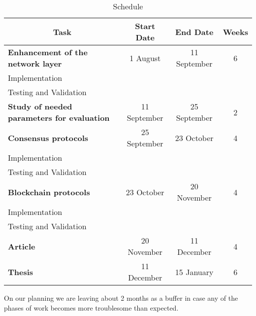 \begin{table}[ht]
\centering
\caption{Schedule}
\label{tab:schedule}
\begin{tabular}{lccc}
  \toprule
  \multicolumn{1}{c}{\textbf{Task}}					& \textbf{Start Date} & \textbf{End Date} & \textbf{Weeks}	\\ 
  \midrule
  \textbf{Enhancement of the network layer}					& 1 August            & 11 September          & 6             	\\
  \quad Implementation 								&                     &                   &                	\\ 
  \quad Testing and Validation 								&                     &                   &                	\\
  \midrule
  \textbf{Study of needed parameters for evaluation}						& 11 September            & 25 September       & 2         	\\
  \midrule
  \textbf{Consensus protocols}						& 25 September             & 23 October       & 4              	\\
  \quad Implementation 								&                     &                   &                	\\ 
  \quad Testing and Validation								&                     &                   &                	\\ 
  \midrule
  \textbf{Blockchain protocols}						& 23 October             & 20 November       & 4          	\\
  \quad Implementation 								&                     &                   &                	\\ 
  \quad Testing and Validation								&                     &                   &                	\\ 
  \midrule
  \textbf{Article}							& 20 November             & 11 December         & 4             	\\ 
  \midrule
  \textbf{Thesis}									& 11 December           & 15 January      & 6          	  	\\   
  \bottomrule
\end{tabular}
\end{table}

On our planning we are leaving about 2 months as a buffer in case any of the
phases of work becomes more troublesome than expected.